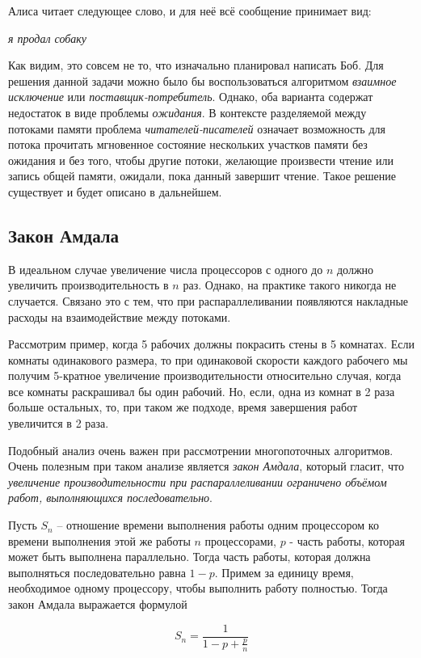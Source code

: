 Алиса читает следующее слово, и для неё всё сообщение принимает вид:

\textit{я продал собаку}

Как видим, это совсем не то, что изначально планировал написать Боб. Для решения
данной задачи можно было бы воспользоваться алгоритмом \textit{взаимное
исключение} или \textit{поставщик-потребитель}. Однако, оба варианта содержат
недостаток в виде проблемы \textit{ожидания}. В контексте разделяемой между
потоками памяти проблема \textit{читателей-писателей} означает возможность для
потока прочитать мгновенное состояние нескольких участков памяти без ожидания
и без того, чтобы другие потоки, желающие произвести чтение или запись общей
памяти, ожидали, пока данный завершит чтение. Такое решение существует и будет
описано в дальнейшем.

\subsection{Закон Амдала}

В идеальном случае увеличение числа процессоров с одного до $n$ должно увеличить
производительность в $n$ раз. Однако, на практике такого никогда не случается.
Связано это с тем, что при распараллеливании появляются накладные расходы на
взаимодействие между потоками.

Рассмотрим пример, когда 5 рабочих должны покрасить стены в 5 комнатах. Если
комнаты одинакового размера, то при одинаковой скорости каждого рабочего мы
получим 5-кратное увеличение производительности относительно случая, когда все
комнаты раскрашивал бы один рабочий. Но, если, одна из комнат в 2 раза больше
остальных, то, при таком же подходе, время завершения работ увеличится в 2 раза.

Подобный анализ очень важен при рассмотрении многопоточных алгоритмов. Очень
полезным при таком анализе является \textit{закон Амдала}, который гласит, что
\textit{увеличение производительности при распараллеливании ограничено объёмом
работ, выполняющихся последовательно}.

Пусть $S_n$ -- отношение времени выполнения работы одним процессором ко времени
выполнения этой же работы $n$ процессорами, $p$ - часть работы, которая может
быть выполнена параллельно. Тогда часть работы, которая должна выполняться
последовательно равна $1-p$. Примем за единицу время, необходимое одному
процессору, чтобы выполнить работу полностью. Тогда закон Амдала выражается
формулой

\begin{equation}
\label{amdal}
S_n = \frac{1}{1-p+\frac{p}{n}}
\end{equation}

